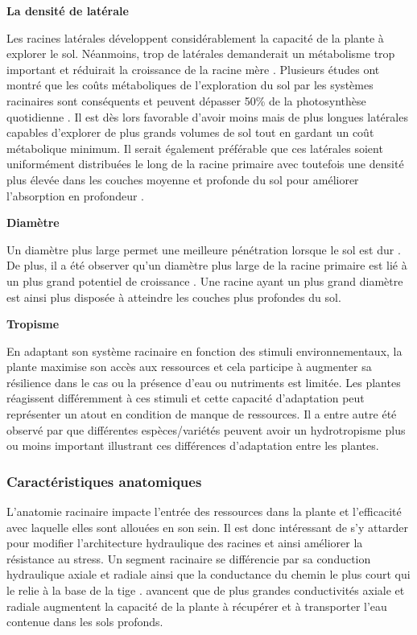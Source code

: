 \noindent \textbf{La densité de latérale}

Les racines latérales développent considérablement la capacité de la plante à explorer le sol.
Néanmoins, trop de latérales demanderait un métabolisme trop important et réduirait la croissance de la racine mère \citep{lynch_root_2014}.
Plusieurs études ont montré que les coûts métaboliques de l'exploration du sol par les systèmes racinaires sont conséquents et peuvent dépasser 50\% de la photosynthèse quotidienne \citep{kafkafi_respiratory_2002}.
Il est dès lors favorable d'avoir moins mais de plus longues latérales capables d'explorer de plus grands volumes de sol tout en gardant un coût métabolique minimum.
Il serait également préférable que ces latérales soient uniformément distribuées le long de la racine primaire avec toutefois une densité plus élevée dans les couches moyenne et profonde du sol pour améliorer l'absorption en profondeur \citep{wasson_traits_2012}.
\newline

\noindent \textbf{Diamètre}

Un diamètre plus large permet une meilleure pénétration lorsque le sol est dur \citep{bengough_root_2011}.
De plus, il a été observer qu'un diamètre plus large de la racine primaire est lié à un plus grand potentiel de croissance \citep{pages_estimating_2010}.
Une racine ayant un plus grand diamètre est ainsi plus disposée à atteindre les couches plus profondes du sol.
\newline

\noindent \textbf{Tropisme}

En adaptant son système racinaire en fonction des stimuli environnementaux, la plante maximise son accès aux ressources et cela participe à augmenter sa résilience dans le cas ou la présence d'eau ou nutriments est limitée.
Les plantes réagissent différemment à ces stimuli et cette capacité d'adaptation peut représenter un atout en condition de manque de ressources.
Il a entre autre été observé par \cite{gul_hydrotropism_2023} que différentes espèces/variétés peuvent avoir un hydrotropisme plus ou moins important illustrant ces différences d'adaptation entre les plantes.

\subsubsection{Caractéristiques anatomiques}

L'anatomie racinaire impacte l'entrée des ressources dans la plante et l'efficacité avec laquelle elles sont allouées en son sein.
Il est donc intéressant de s'y attarder pour modifier l'architecture hydraulique des racines et ainsi améliorer la résistance au stress.
Un segment racinaire se différencie par sa conduction hydraulique axiale et radiale ainsi que la conductance du chemin le plus court qui le relie à la base de la tige \citep{lobet_plant_2014}.
\cite{wasson_traits_2012} avancent que de plus grandes conductivités axiale et radiale augmentent la capacité de la plante à récupérer et à transporter l'eau contenue dans les sols profonds. 
\newline

